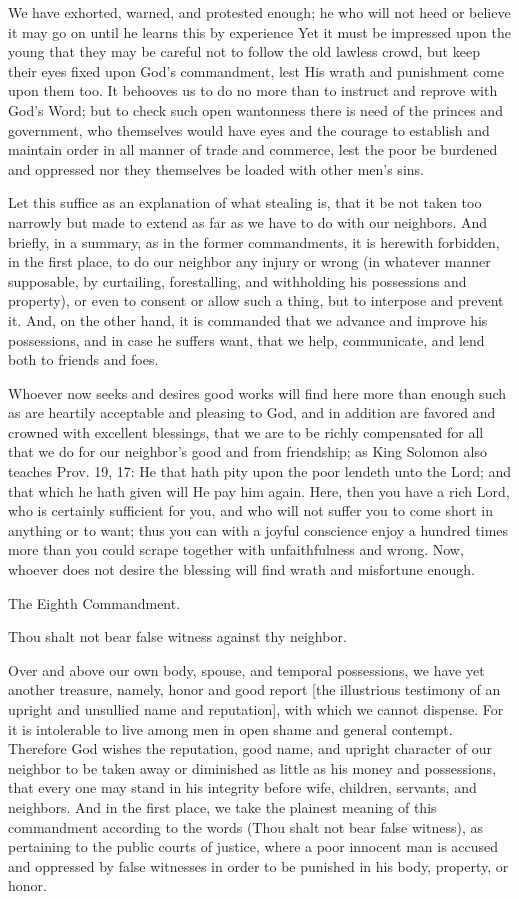 We have exhorted, warned, and protested enough; he who will not heed or
believe it may go on until he learns this by experience Yet it must be
impressed upon the young that they may be careful not to follow the old
lawless crowd, but keep their eyes fixed upon God's commandment, lest
His wrath and punishment come upon them too. It behooves us to do no
more than to instruct and reprove with God's Word; but to check such
open wantonness there is need of the princes and government, who
themselves would have eyes and the courage to establish and maintain
order in all manner of trade and commerce, lest the poor be burdened
and oppressed nor they themselves be loaded with other men's sins.

Let this suffice as an explanation of what stealing is, that it be not
taken too narrowly but made to extend as far as we have to do with our
neighbors. And briefly, in a summary, as in the former commandments, it
is herewith forbidden, in the first place, to do our neighbor any
injury or wrong (in whatever manner supposable, by curtailing,
forestalling, and withholding his possessions and property), or even to
consent or allow such a thing, but to interpose and prevent it. And, on
the other hand, it is commanded that we advance and improve his
possessions, and in case he suffers want, that we help, communicate,
and lend both to friends and foes.

Whoever now seeks and desires good works will find here more than
enough such as are heartily acceptable and pleasing to God, and in
addition are favored and crowned with excellent blessings, that we are
to be richly compensated for all that we do for our neighbor's good and
from friendship; as King Solomon also teaches Prov. 19, 17: He that
hath pity upon the poor lendeth unto the Lord; and that which he hath
given will He pay him again. Here, then you have a rich Lord, who is
certainly sufficient for you, and who will not suffer you to come short
in anything or to want; thus you can with a joyful conscience enjoy a
hundred times more than you could scrape together with unfaithfulness
and wrong. Now, whoever does not desire the blessing will find wrath
and misfortune enough.

The Eighth Commandment.

Thou shalt not bear false witness against thy neighbor.

Over and above our own body, spouse, and temporal possessions, we have
yet another treasure, namely, honor and good report [the illustrious
testimony of an upright and unsullied name and reputation], with which
we cannot dispense. For it is intolerable to live among men in open
shame and general contempt. Therefore God wishes the reputation, good
name, and upright character of our neighbor to be taken away or
diminished as little as his money and possessions, that every one may
stand in his integrity before wife, children, servants, and neighbors.
And in the first place, we take the plainest meaning of this
commandment according to the words (Thou shalt not bear false witness),
as pertaining to the public courts of justice, where a poor innocent
man is accused and oppressed by false witnesses in order to be punished
in his body, property, or honor.


